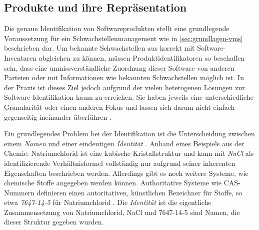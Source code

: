 \subsection{Produkte und ihre Repräsentation}


Die genaue Identifikation von Softwareprodukten stellt eine grundlegende Voraussetzung für ein Schwachstellenmanagement wie in \autoref{sec:grundlagen-vms} beschrieben dar.
Um bekannte Schwachstellen aus  korrekt mit Software-Inventaren abgleichen zu können, müssen Produktidentifikatoren so beschaffen sein, dass eine unmissverständliche Zuordnung dieser Software von anderen Parteien oder mit Informationen wie bekannten Schwachstellen möglich ist.
In der Praxis ist dieses Ziel jedoch aufgrund der vielen heterogenen Lösungen zur Software-Identifikation kaum zu erreichen.
Sie haben jeweils eine unterschiedliche Granularität oder einen anderen Fokus und lassen sich darum nicht einfach gegenseitig ineinander überführen \autocite{CISA2023}.

Ein grundlegendes Problem bei der Identifikation ist die Unterscheidung zwischen einem \textit{Namen} und einer eindeutigen \textit{Identität} \autocite{Manion_Proell_Schmidt2023}.
Anhand eines Beispiels aus der Chemie:
Natriumchlorid ist eine kubische Kristallstruktur und kann mit \textit{NaCl} als identifizierende Verhältnisformel vollständig nur aufgrund seiner inherenten Eigenschaften beschrieben werden.
Allerdings gibt es noch weitere Systeme, wie chemische Stoffe angegeben werden können.
Authoritative Systeme wie CAS-Nummern definieren einen autoritativen, künstlichen Bezeichner für Stoffe, so etwa \textit{7647-14-5} für Natriumchlorid \autocite{Huebner_2003}.
Die \textit{Identität} ist die eigentliche Zusammensetzung von Natriumchlorid, NaCl und 7647-14-5 sind Namen, die dieser Struktur gegeben wurden.

